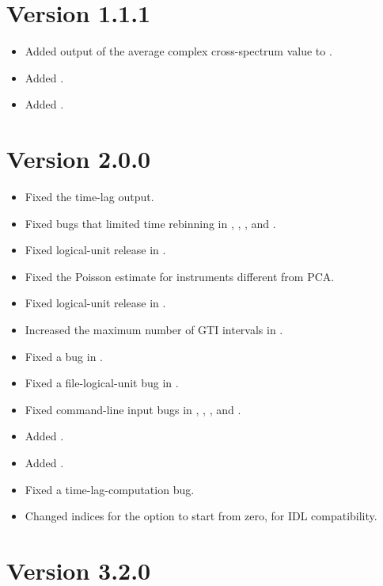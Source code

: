 \section*{Version 1.1.1}

\begin{itemize}
\item Added output of the average complex cross-spectrum value to
      .
\item Added .
\item Added .
\end{itemize}

\section*{Version 2.0.0}

\begin{itemize}
\item Fixed the  time-lag output.
\item Fixed bugs that limited time rebinning in ,
      , , and .
\item Fixed logical-unit release in .
\item Fixed the  Poisson estimate for instruments different
      from PCA.
\item Fixed logical-unit release in .
\item Increased the maximum number of GTI intervals in .
\item Fixed a bug in .
\item Fixed a file-logical-unit bug in .
\item Fixed command-line input bugs in , ,
      , and .
\item Added .
\item Added .
\item Fixed a  time-lag-computation bug.
\item Changed  indices for the  option to start from
      zero, for IDL  compatibility.
\end{itemize}

\section*{Version 3.2.0}


